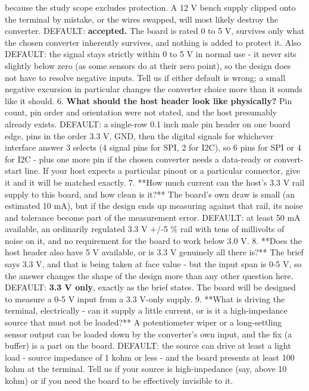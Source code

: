 \documentclass[11pt,a4paper]{article}
\begin{document}
because the study scope excludes protection. A 12 V bench supply clipped onto the terminal by mistake, or the wires swapped, will most likely destroy the converter. DEFAULT: \textbf{accepted.} The board is rated 0 to 5 V, survives only what the chosen converter inherently survives, and nothing is added to protect it. Also DEFAULT: the signal stays strictly within 0 to 5 V in normal use - it never sits slightly below zero (as some sensors do at their zero point), so the design does not have to resolve negative inputs. Tell us if either default is wrong; a small negative excursion in particular changes the converter choice more than it sounds like it should. 6. \textbf{What should the host header look like physically?} Pin count, pin order and orientation were not stated, and the host presumably already exists. DEFAULT: a single-row 0.1 inch male pin header on one board edge, pins in the order 3.3 V, GND, then the digital signals for whichever interface answer 3 selects (4 signal pins for SPI, 2 for I2C), so 6 pins for SPI or 4 for I2C - plus one more pin if the chosen converter needs a data-ready or convert-start line. If your host expects a particular pinout or a particular connector, give it and it will be matched exactly. 7. {*}{*}How much current can the host's 3.3 V rail supply to this board, and how clean is it?{*}{*} The board's own draw is small (an estimated 10 mA), but if the design ends up measuring against that rail, its noise and tolerance become part of the measurement error. DEFAULT: at least 50 mA available, an ordinarily regulated 3.3 V +/-5 \% rail with tens of millivolts of noise on it, and no requirement for the board to work below 3.0 V. 8. {*}{*}Does the host header also have 5 V available, or is 3.3 V genuinely all there is?{*}{*} The brief says 3.3 V, and that is being taken at face value - but the input span is 0-5 V, so the answer changes the shape of the design more than any other question here. DEFAULT: \textbf{3.3 V only}, exactly as the brief states. The board will be designed to measure a 0-5 V input from a 3.3 V-only supply. 9. {*}{*}What is driving the terminal, electrically - can it supply a little current, or is it a high-impedance source that must not be loaded?{*}{*} A potentiometer wiper or a long-settling sensor output can be loaded down by the converter's own input, and the fix (a buffer) is a part on the board. DEFAULT: the source can drive at least a light load - source impedance of 1 kohm or less - and the board presents at least 100 kohm at the terminal. Tell us if your source is high-impedance (say, above 10 kohm) or if you need the board to be effectively invisible to it.
\end{document}

